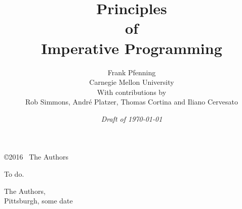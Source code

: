 \newcommand{\thetitle}{Principles\\[0.5ex] of\\[1.2ex] Imperative Programming}
\newcommand{\thecourse}{15-122}

\title{{\Huge \bf \thetitle}}
\author{{\LARGE Frank Pfenning}
 \\[1ex]{\large Carnegie Mellon University}
 \\[5ex] With contributions by
 \\ Rob Simmons,
    Andr\'e Platzer,
    Thomas Cortina and
    Iliano Cervesato}
\date{\em Draft of \today}

\pagestyle{fancyplain}
\renewcommand{\chaptermark}[1]{\markboth{\sc Chapter \thechapter. #1}{}}
\renewcommand{\sectionmark}[1]{\markright{\sc \thesection. #1}{}}
\renewcommand{\thepage}{\emph{\roman{page}}}
\maketitle

\thispagestyle{empty}
\cleardoublepage
\setcounter{page}{1}
\vspace*{0.5\textheight}
\begin{center}
  \copyright 2016 \ The Authors
\end{center}

\cleardoublepage
\hypertarget{toc}{}
\dominitoc\tableofcontents

\listoffigures

\cleardoublepage
\thispagestyle{plain}
\begin{preface}%
  To do.
\end{preface}

\bigskip
\begin{flushright}
  The Authors,
\\Pittsburgh, some date
\end{flushright}


\cleardoublepage
\renewcommand{\thepage}{\arabic{page}}
\setcounter{page}{1}
\rhead[\rightmark]{\fancyplain{}{\gototoc\thepage}}


\newcommand{\title}[1]{}
\newcommand{\date}[1]{}


